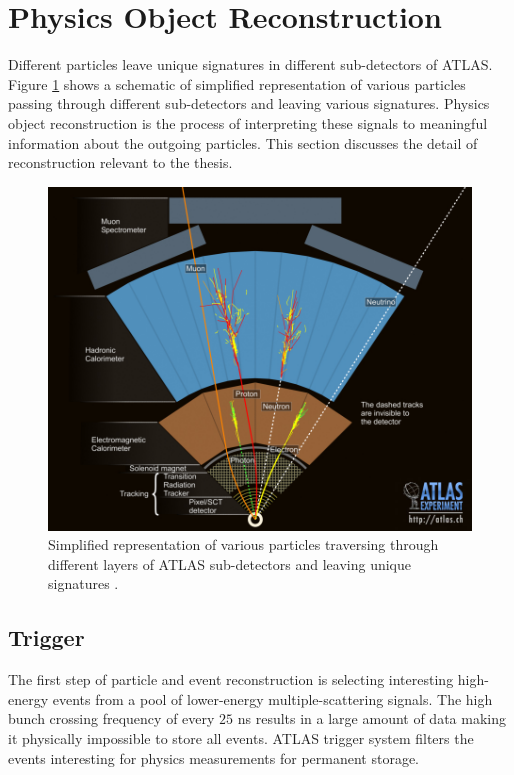 \section{ Physics Object Reconstruction} 
\label{sec:ParticleReconstruction}
Different particles leave unique signatures in different sub-detectors of ATLAS. Figure \ref{fig:ATLASTransverse} shows a schematic of simplified representation of various particles passing through different sub-detectors and leaving various signatures. Physics object reconstruction is the process of interpreting these signals to meaningful information about the outgoing particles. This section discusses the detail of reconstruction relevant to the thesis. 

\begin{figure}
    \centering
    \includegraphics[width=.98\linewidth]{figures/LHC/ATLAS_Transverse.jpg}
    \caption{ Simplified representation of various particles traversing through different layers of ATLAS sub-detectors and leaving unique signatures \cite{ATLASTransverse}.\label{fig:ATLASTransverse}}
\end{figure}

\subsection{Trigger}
\label{subsec:TriggerATLAS}
The first step of particle and event reconstruction is selecting interesting high-energy events from a pool of lower-energy multiple-scattering signals. The high bunch crossing frequency of every $25$ ns results in a large amount of data making it physically impossible to store all events. ATLAS trigger system filters the events interesting for physics measurements for permanent storage. 

